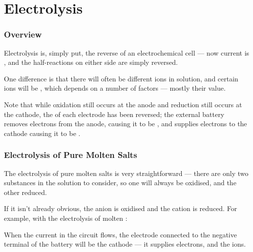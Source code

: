 

\pagebreak
\part{Electrolysis}

	\section{Overview}

		Electrolysis is, simply put, the reverse of an electrochemical cell --- now current is , and the half-reactions
		on either side are simply reversed.

		One difference is that there will often be different ions in solution, and certain ions will be , which
		depends on a number of factors --- mostly their \Eo{} value.

		Note that while oxidation still occurs at the anode and reduction still occurs at the cathode, the  of each
		electrode has been reversed; the external battery removes electrons from the anode, causing it to be , and
		supplies electrons to the cathode causing it to be .


	\section{Electrolysis of Pure Molten Salts}

		The electrolysis of pure molten salts is very straightforward --- there are only two substances in the solution to consider, so one will
		always be oxidised, and the other reduced.

		If it isn't already obvious, the anion is oxidised and the cation is reduced. For example, with the electrolysis of molten :


		When the current in the circuit flows, the electrode connected to the negative terminal of the battery will be the cathode --- it supplies
		electrons, and  the  ions.

